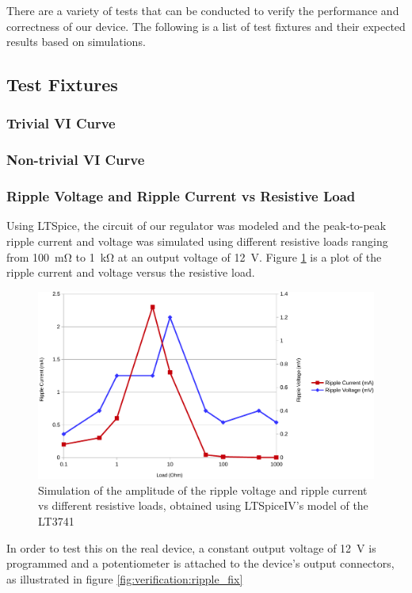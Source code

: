 There are a variety of tests that can be conducted to verify the performance and
correctness of our  device.  The  following is a list of test fixtures and their
expected results based on simulations.

\subsection{Test Fixtures}

\subsubsection{Trivial VI Curve}


\subsubsection{Non-trivial VI Curve}


\subsubsection{Ripple Voltage and Ripple Current vs Resistive Load}

Using  LTSpice,  the circuit of our regulator was modeled and  the  peak-to-peak
ripple current and voltage was simulated using different resistive loads ranging
from  \SI{100}{\milli\ohm}   to   \SI{1}{\kilo\ohm}  at  an  output  voltage  of
\SI{12}{\volt}. Figure \ref{fig:verification:ripple_sim} is a plot of the ripple
current and voltage versus the resistive load.

\begin{figure}[th!]
    \centering
    \includegraphics[width=.7\textwidth]{images/sim/ripple-vs-load.pdf}
    \caption{Simulation of the amplitude of the ripple voltage and ripple current vs different resistive loads, obtained using LTSpiceIV's model of the LT3741}
    \label{fig:verification:ripple_sim}
\end{figure}

In  order  to  test this on the  real  device,  a  constant  output  voltage  of
\SI{12}{\volt} is programmed and a potentiometer  is  attached  to  the device's
output connectors, as illustrated in figure \ref{fig:verification:ripple_fix}

